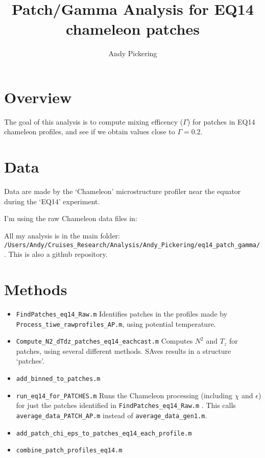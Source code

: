 \documentclass[11pt]{article}
\title{Patch/Gamma Analysis for EQ14 chameleon patches}
\author{Andy Pickering}
\begin{document}
\maketitle

\tableofcontents
\newpage

\section{Overview}

The goal of this analysis is to compute mixing efficency ($\Gamma$) for patches in EQ14 chameleon profiles, and see if we obtain values close to $\Gamma=0.2$.

\section{Data}

Data are made by the `Chameleon' microstructure profiler near the equator during the `EQ14' experiment. 
\medskip

I'm using the raw Chameleon data files in: \newline
\verb++

\medskip

All my analysis is in the main folder: \newline  \verb+/Users/Andy/Cruises_Research/Analysis/Andy_Pickering/eq14_patch_gamma/+ . This is also a github repository.


\section{Methods}

\begin{itemize}

\item \verb+FindPatches_eq14_Raw.m+ Identifies patches in the profiles made by \verb+Process_tiwe_rawprofiles_AP.m+, using potential temperature.

\item \verb+Compute_N2_dTdz_patches_eq14_eachcast.m+ Computes $N^2$ and $T_z$ for patches, using several different methods. SAves results in a structure `patches'.

\item \verb+add_binned_to_patches.m+

\item \verb+run_eq14_for_PATCHES.m+ Runs the Chameleon processing (including $\chi$ and $\epsilon$) for just the patches identified in \verb+FindPatches_eq14_Raw.m+ . This calls \verb+average_data_PATCH_AP.m+ instead of \verb+average_data_gen1.m+.

\item \verb+add_patch_chi_eps_to_patches_eq14_each_profile.m+

\item \verb+combine_patch_profiles_eq14.m+


\end{itemize}
\end{document}
